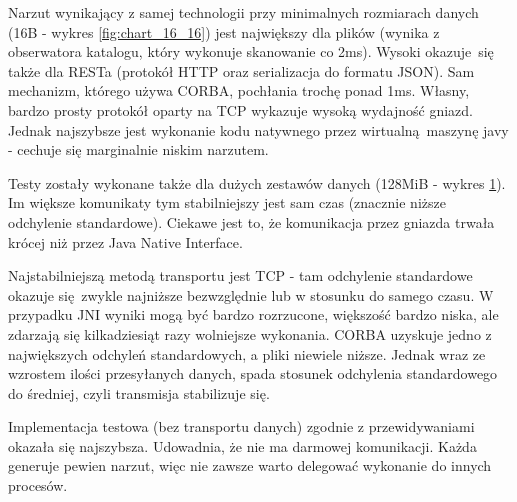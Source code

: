 Narzut wynikający z samej technologii przy minimalnych rozmiarach danych (16B - wykres \ref{fig:chart_16_16}) jest największy dla plików (wynika z obserwatora katalogu, który wykonuje skanowanie co 2ms). Wysoki okazuje się także dla RESTa (protokół HTTP oraz serializacja do formatu JSON). Sam mechanizm, którego używa CORBA, pochłania trochę ponad 1ms. Własny, bardzo prosty protokół oparty na TCP wykazuje wysoką wydajność gniazd. Jednak najszybsze jest wykonanie kodu natywnego przez wirtualną maszynę javy - cechuje się marginalnie niskim narzutem.
 

\begin{figure}[H]
\caption{}
\label{fig:chart_134217728_134217728}
\end{figure}

Testy zostały wykonane także dla dużych zestawów danych (128MiB - wykres \ref{fig:chart_134217728_134217728}). Im większe komunikaty tym stabilniejszy jest sam czas (znacznie niższe odchylenie standardowe). Ciekawe jest to, że komunikacja przez gniazda trwała krócej niż przez Java Native Interface.

Najstabilniejszą metodą transportu jest TCP - tam odchylenie standardowe okazuje się zwykle najniższe bezwzględnie lub w stosunku do samego czasu. W przypadku JNI wyniki mogą być bardzo rozrzucone, większość bardzo niska, ale zdarzają się kilkadziesiąt razy wolniejsze wykonania.
CORBA uzyskuje jedno z największych odchyleń standardowych, a pliki niewiele niższe. Jednak wraz ze wzrostem ilości przesyłanych danych, spada stosunek odchylenia standardowego do średniej, czyli transmisja stabilizuje się.

Implementacja testowa (bez transportu danych) zgodnie z przewidywaniami okazała się najszybsza. Udowadnia, że nie ma darmowej komunikacji. Każda generuje pewien narzut, więc nie zawsze warto delegować wykonanie do innych procesów.


